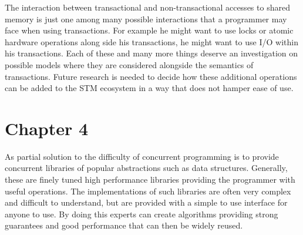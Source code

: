 The interaction between transactional and non-transactional accesses to shared memory
is just one among many possible interactions that a programmer may face when using
transactions.
For example he might want to use locks or atomic hardware operations along side his transactions,
he might want to use I/O within his transactions.
Each of these and many more things deserve an investigation on possible models where
they are considered alongside the semantics of transactions.
Future research is needed to decide how these additional operations can be added
to the STM ecosystem in a way that does not hamper ease of use.








\section{Chapter 4}
As partial solution to the difficulty of concurrent programming
is to provide concurrent libraries of popular abstractions such as data structures.
Generally, these are finely tuned high performance libraries
providing the programmer with useful operations.
The implementations of such libraries are often very complex
and difficult to understand, but are provided with a simple to use
interface for anyone to use.
By doing this experts can create algorithms providing strong guarantees
and good performance that can then be widely reused.

% 
% 

